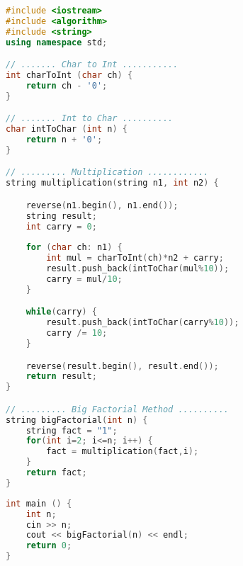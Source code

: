 \setlength{\columnsep}{1 cm}
\begin{multicols}{2}

\begin{lstlisting}[language=C++]
#include <iostream>
#include <algorithm>
#include <string>
using namespace std;

// ....... Char to Int ...........
int charToInt (char ch) {
    return ch - '0';
}

// ....... Int to Char ..........
char intToChar (int n) {
    return n + '0';
}

// ......... Multiplication ............
string multiplication(string n1, int n2) {

    reverse(n1.begin(), n1.end());
    string result;
    int carry = 0;
    
    for (char ch: n1) {
        int mul = charToInt(ch)*n2 + carry;
        result.push_back(intToChar(mul%10));
        carry = mul/10;
    }

    while(carry) {
        result.push_back(intToChar(carry%10));
        carry /= 10;
    }

    reverse(result.begin(), result.end());
    return result;
}

// ......... Big Factorial Method ..........
string bigFactorial(int n) {
    string fact = "1";
    for(int i=2; i<=n; i++) {
        fact = multiplication(fact,i);
    }
    return fact;
}
\end{lstlisting}

\columnbreak

\begin{lstlisting}[language=C++]
int main () {
    int n;
    cin >> n;
    cout << bigFactorial(n) << endl;
    return 0;
}
\end{lstlisting}

\end{multicols}



